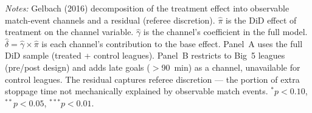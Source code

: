\begin{table}[htbp]
\begin{threeparttable}
\begin{tablenotes}[flushleft]
\footnotesize
\item \textit{Notes:} Gelbach (2016) decomposition of the treatment effect into
observable match-event channels and a residual (referee discretion). $\hat{\pi}$
is the DiD effect of treatment on the channel variable. $\hat{\gamma}$ is the
channel's coefficient in the full model. $\hat{\delta} = \hat{\gamma} \times
\hat{\pi}$ is each channel's contribution to the base effect. Panel~A uses
the full DiD sample (treated + control leagues). Panel~B restricts to Big~5
leagues (pre/post design) and adds late goals ($>$90~min) as a channel,
unavailable for control leagues. The residual captures referee discretion ---
the portion of extra stoppage time not mechanically explained by observable
match events. $^{*}p<0.10$, $^{**}p<0.05$, $^{***}p<0.01$.
\end{tablenotes}
\end{threeparttable}
\end{table}


